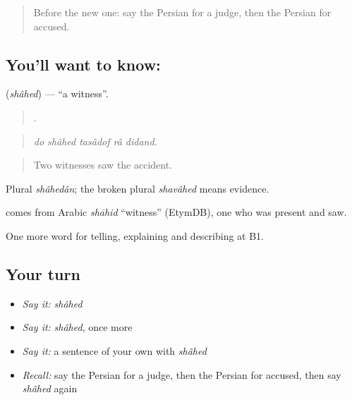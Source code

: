 \label{lesson:FA-C406-shahed}



\begin{quote}
Before the new one: say the Persian for a judge, then the Persian for accused.
\end{quote}

\subsection*{You'll want to know: }
\textbf{} (\emph{shâhed}) — \textquotedblleft{}a witness\textquotedblright{}.

\begin{quote}
    .
\end{quote}

\begin{quote}
\emph{do shâhed tasâdof râ didand.}
\end{quote}

\begin{quote}
Two witnesses saw the accident.
\end{quote}

Plural \emph{shâhedân}; the broken plural \emph{shavâhed} means evidence.

\begin{cousinweb}
\textbf{} comes from Arabic \emph{shāhid} \textquotedblleft{}witness\textquotedblright{} (EtymDB), one who was present and saw.
\end{cousinweb}

\begin{grammarlens}[title={What you've built}]
One more word for telling, explaining and describing at B1.
\end{grammarlens}

\subsection*{Your turn}
\begin{itemize}
\raggedright
  \item \emph{Say it:} \emph{shâhed}
  \item \emph{Say it:} \emph{shâhed}, once more
  \item \emph{Say it:} a sentence of your own with \emph{shâhed}
  \item \emph{Recall:} say the Persian for a judge, then the Persian for accused, then say \emph{shâhed} again
\end{itemize}

